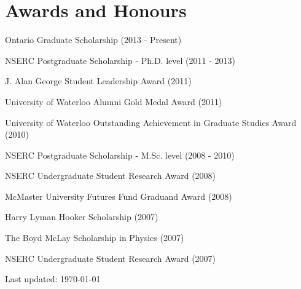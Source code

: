 \documentclass[letterpaper]{article}
\def\footerlink{http://jblevins.org/projects/cv-template/}
\renewenvironment{itemize}{
  \begin{list}{}{
    \setlength{\leftmargin}{1.5em}
  }
}{
  \end{list}
}
\begin{document}
\section*{Awards and Honours}

\begin{itemize}
\item Ontario Graduate Scholarship (2013 - Present)
\item NSERC Postgraduate Scholarship - Ph.D. level (2011 - 2013)
\item J. Alan George Student Leadership Award (2011)
\item University of Waterloo Alumni Gold Medal Award (2011)
\item University of Waterloo Outstanding Achievement in Graduate Studies Award (2010)
\item NSERC Postgraduate Scholarship - M.Sc. level (2008 - 2010)
\item NSERC Undergraduate Student Research Award (2008)
\item McMaster University Futures Fund Graduand Award (2008)
\item Harry Lyman Hooker Scholarship (2007)
\item The Boyd McLay Scholarship in Physics (2007)
\item NSERC Undergraduate Student Research Award (2007)
\end{itemize}


\bigskip

\begin{center}
  \begin{footnotesize}
    Last updated: \today \\
  \end{footnotesize}
\end{center}
\end{document}
